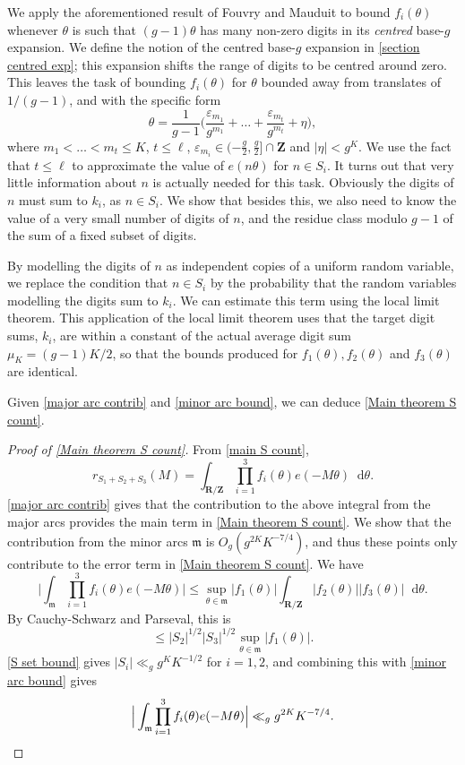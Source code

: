 \documentclass[hidelinks,11pt,reqno]{amsart}
\renewcommand{\leq}{\leqslant}
\newcommand{\Z}{\ensuremath{\mathbf{Z}}}
\newcommand{\R}{\ensuremath{\mathbf{R}}}
\newcommand*\dif{\mathop{}\!\mathrm{d}}
\theoremstyle{remark}
\begin{document}
We apply the aforementioned result of Fouvry and Mauduit \cite{fouvry2005entiers} to bound $f_{i}(\theta)$ whenever $\theta$ is such that $(g-1)\theta$ has many non-zero digits in its \textit{centred} base-$g$ expansion. We define the notion of the centred base-$g$ expansion in \cref{section centred exp}; this expansion shifts the range of digits to be centred around zero. This leaves the task of bounding $f_{i}(\theta)$ for $\theta$ bounded away from translates of $1/(g-1)$, and with the specific form  
 \[\theta=\frac{1}{g-1}\Big (\frac{\varepsilon_{m_{1}}}{g^{m_{1}}}+ \ldots + \frac{\varepsilon_{m_{t}}}{g^{m_{t}}}+\eta\Big ),\]
where $m_{1}<\ldots <m_{t}\leq K$, $t\leq \ell$, $\varepsilon_{m_{i}}\in (-\tfrac{g}{2},\tfrac{g}{2}]\cap \Z$ and $|\eta|<g^{K}$. We use the fact that $t\leq \ell$ to approximate the value of $e(n\theta)$ for $n\in S_{i}$. It turns out that very little information about $n$ is actually needed for this task. Obviously the digits of $n$ must sum to $k_{i}$, as $n\in S_i$. We show that besides this, we also need to know the value of a very small number of digits of $n$, and the residue class modulo $g-1$ of the sum of a fixed subset of digits. 

By modelling the digits of $n$ as independent copies of a uniform random variable, we replace the condition that $n\in S_{i}$ by the probability that the random variables modelling the digits sum to $k_{i}$. We can estimate this term using the local limit theorem. This application of the local limit theorem uses that the target digit sums, $k_{i}$, are within a constant of the actual average digit sum $\mu_{K}=(g-1)K/2$, so that the bounds produced for $f_{1}(\theta),f_{2}(\theta)$ and $f_{3}(\theta)$ are identical.

Given \cref{major arc contrib} and \cref{minor arc bound}, we can deduce \cref{Main theorem S count}.
\begin{proof}[Proof of \cref{Main theorem S count}]
From \cref{main S count},
\begin{equation}
    r_{S_{1}+S_{2}+S_{3}}(M)=\int_{\R/\Z}\prod_{i=1}^{3}f_{i}(\theta)e(-M\theta)\dif\theta.
\end{equation}
\cref{major arc contrib} gives that the contribution to the above integral from the major arcs provides the main term in \cref{Main theorem S count}. We show that the contribution from the minor arcs $\mathfrak{m}$ is $O_{g}(g^{2K}K^{-7/4})$, and thus these points only contribute to the error term in \cref{Main theorem S count}. We have
\[\Big |\int_{\mathfrak{m}}\prod_{i=1}^{3}f_{i}(\theta)e(-M\theta)\Big |\leq \sup_{\theta\in \mathfrak{m}}|f_{1}(\theta)|\int_{\R/\Z}|f_{2}(\theta)||f_{3}(\theta)|\dif \theta.\]
By Cauchy-Schwarz and Parseval, this is
\[\leq |S_{2}|^{1/2}|S_{3}|^{1/2}\sup_{\theta\in \mathfrak{m}}|f_{1}(\theta)|.\]
\cref{S set bound} gives $|S_{i}|\ll_{g} g^{K}K^{-1/2}$ for $i=1,2$, and combining this with \cref{minor arc bound} gives
\[\Big |\int_{\mathfrak{m}}\prod_{i=1}^{3}f_{i}(\theta)e(-M\theta)\Big |\ll_{g} g^{2K}K^{-7/4}.\qedhere\]  
\end{proof}
\end{document}
